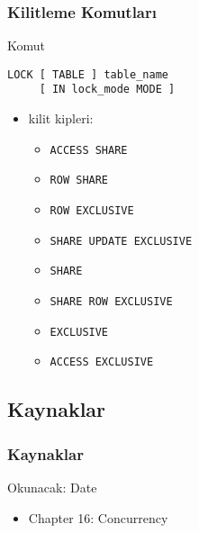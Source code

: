 \documentclass[dvipsnames]{beamer}
\theoremstyle{definition}
\theoremstyle{example}
\theoremstyle{plain}
\begin{document}
\begin{frame}[fragile]
  \frametitle{Kilitleme Komutları}

  \begin{block}{Komut}
    \begin{lstlisting}
LOCK [ TABLE ] table_name
     [ IN lock_mode MODE ]
    \end{lstlisting}

    \pause
    \begin{itemize}
      \item kilit kipleri:
      \begin{itemize}
        \item \lstinline!ACCESS SHARE!
        \item \lstinline!ROW SHARE!
        \item \lstinline!ROW EXCLUSIVE!
        \item \lstinline!SHARE UPDATE EXCLUSIVE!
        \item \lstinline!SHARE!
        \item \lstinline!SHARE ROW EXCLUSIVE!
        \item \lstinline!EXCLUSIVE!
        \item \lstinline!ACCESS EXCLUSIVE!
      \end{itemize}
    \end{itemize}

  \end{block}
\end{frame}

\subsection*{Kaynaklar}

\begin{frame}
  \frametitle{Kaynaklar}

  \begin{block}{Okunacak: Date}
    \begin{itemize}
      \item Chapter 16: \alert{Concurrency}
    \end{itemize}
  \end{block}
\end{frame}
\end{document}
